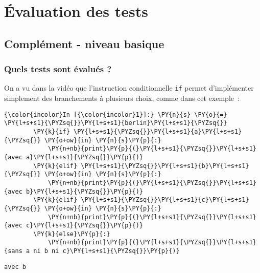     
    
    
    

    

    \hypertarget{uxe9valuation-des-tests}{%
\section{Évaluation des tests}\label{uxe9valuation-des-tests}}

    \hypertarget{compluxe9ment---niveau-basique}{%
\subsection{Complément - niveau
basique}\label{compluxe9ment---niveau-basique}}

    \hypertarget{quels-tests-sont-uxe9valuuxe9s}{%
\subsubsection{Quels tests sont évalués
?}\label{quels-tests-sont-uxe9valuuxe9s}}

    On a vu dans la vidéo que l'instruction conditionnelle \texttt{if}
permet d'implémenter simplement des branchements à plusieurs choix,
comme dans cet exemple~:

    \begin{Verbatim}[commandchars=\\\{\},frame=single,framerule=0.3mm,rulecolor=\color{cellframecolor}]
{\color{incolor}In [{\color{incolor}1}]:} \PY{n}{s} \PY{o}{=} \PY{l+s+s1}{\PYZsq{}}\PY{l+s+s1}{berlin}\PY{l+s+s1}{\PYZsq{}}
        \PY{k}{if} \PY{l+s+s1}{\PYZsq{}}\PY{l+s+s1}{a}\PY{l+s+s1}{\PYZsq{}} \PY{o+ow}{in} \PY{n}{s}\PY{p}{:}
            \PY{n+nb}{print}\PY{p}{(}\PY{l+s+s1}{\PYZsq{}}\PY{l+s+s1}{avec a}\PY{l+s+s1}{\PYZsq{}}\PY{p}{)}
        \PY{k}{elif} \PY{l+s+s1}{\PYZsq{}}\PY{l+s+s1}{b}\PY{l+s+s1}{\PYZsq{}} \PY{o+ow}{in} \PY{n}{s}\PY{p}{:}
            \PY{n+nb}{print}\PY{p}{(}\PY{l+s+s1}{\PYZsq{}}\PY{l+s+s1}{avec b}\PY{l+s+s1}{\PYZsq{}}\PY{p}{)}
        \PY{k}{elif} \PY{l+s+s1}{\PYZsq{}}\PY{l+s+s1}{c}\PY{l+s+s1}{\PYZsq{}} \PY{o+ow}{in} \PY{n}{s}\PY{p}{:}
            \PY{n+nb}{print}\PY{p}{(}\PY{l+s+s1}{\PYZsq{}}\PY{l+s+s1}{avec c}\PY{l+s+s1}{\PYZsq{}}\PY{p}{)}
        \PY{k}{else}\PY{p}{:}
            \PY{n+nb}{print}\PY{p}{(}\PY{l+s+s1}{\PYZsq{}}\PY{l+s+s1}{sans a ni b ni c}\PY{l+s+s1}{\PYZsq{}}\PY{p}{)}
\end{Verbatim}


    \begin{Verbatim}[commandchars=\\\{\},frame=single,framerule=0.3mm,rulecolor=\color{cellframecolor}]
avec b
\end{Verbatim}

